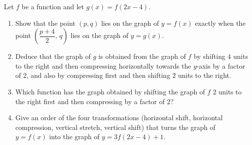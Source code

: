 Let $f$ be a function and let $g(x)=f(2x-4)$.
\begin{enumerate}
\item[(a)] Show that the point $(p,q)$ lies on the graph of $y=f(x)$ exactly when the point $\left(\dfrac{p+4}{2},\,q\right)$ lies on the graph of $y=g(x)$.
\item[(b)] Deduce that the graph of $g$ is obtained from the graph of $f$ by shifting $4$ units to the right and then compressing horizontally towards the $y$-axis by a factor of $2$, and also by compressing first and then shifting $2$ units to the right.
\item[(c)] Which function has the graph obtained by shifting the graph of $f$ $2$ units to the right first and then compressing by a factor of $2$?
\item[(d)] Give an order of the four transformations (horizontal shift, horizontal compression, vertical stretch, vertical shift) that turns the graph of $y=f(x)$ into the graph of $y=3f(2x-4)+1$.
\end{enumerate}
